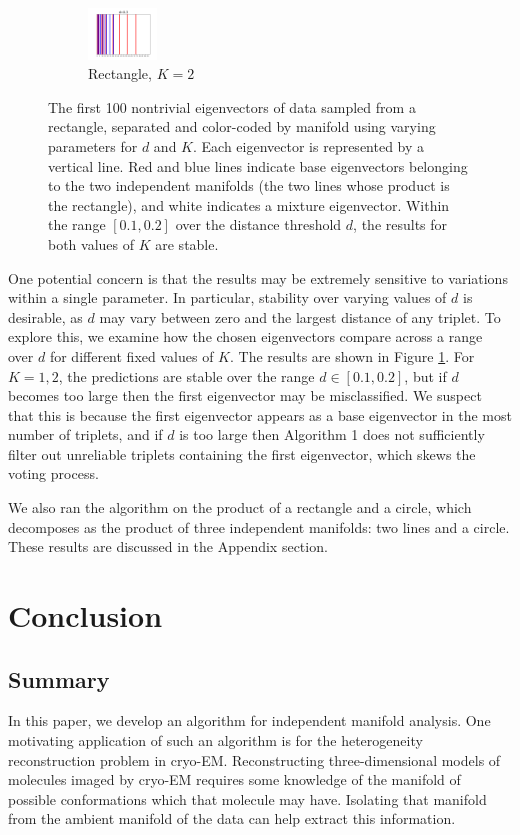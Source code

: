 \documentclass{article}
\numberwithin{equation}{section}
\theoremstyle{definition}
\begin{document}
\begin{figure}[ht]
\begin{subfigure}[t]{\textwidth}
        \includegraphics[width=0.2\textwidth]{images/line_line_2_0.3_eigenvector_division.png}
        \caption{Rectangle, $K=2$}
    \end{subfigure}
    \caption{The first 100 nontrivial eigenvectors of data sampled from a rectangle, separated and color-coded by manifold using varying parameters for $d$ and $K$. Each eigenvector is represented by a vertical line. Red and blue lines indicate base eigenvectors belonging to the two independent manifolds (the two lines whose product is the rectangle), and white indicates a mixture eigenvector. Within the range $[0.1, 0.2]$ over the distance threshold $d$, the results for both values of $K$ are stable.}
    \label{fig:stability_rectangle}
\end{figure}

One potential concern is that the results may be extremely sensitive to variations within a single parameter. In particular, stability over varying values of $d$ is desirable, as $d$ may vary between zero and the largest distance of any triplet. To explore this, we examine how the chosen eigenvectors compare across a range over $d$ for different fixed values of $K$. The results are shown in Figure \ref{fig:stability_rectangle}. For $K=1,2$, the predictions are stable over the range $d \in [0.1,0.2]$, but if $d$ becomes too large then the first eigenvector may be misclassified. We suspect that this is because the first eigenvector appears as a base eigenvector in the most number of triplets, and if $d$ is too large then Algorithm 1 does not sufficiently filter out unreliable triplets containing the first eigenvector, which skews the voting process.

We also ran the algorithm on the product of a rectangle and a circle, which decomposes as the product of three independent manifolds: two lines and a circle. These results are discussed in the Appendix section.

\section{Conclusion}
\subsection{Summary}
In this paper, we develop an algorithm for independent manifold analysis. One motivating application of such an algorithm is for the heterogeneity reconstruction problem in cryo-EM. Reconstructing three-dimensional models of molecules imaged by cryo-EM requires some knowledge of the manifold of possible conformations which that molecule may have. Isolating that manifold from the ambient manifold of the data can help extract this information.
\end{document}
